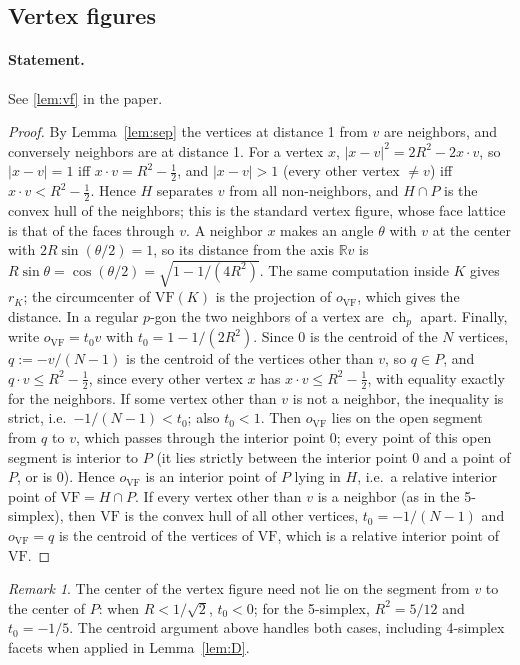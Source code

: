 \documentclass[11pt]{article}
\theoremstyle{definition}
\theoremstyle{remark}
\newtheorem{remark}[theorem]{Remark}
\newcommand{\R}{\mathbb{R}}
\newcommand{\VF}{\mathrm{VF}}
\newcommand{\ch}{\operatorname{ch}}
\begin{document}
\subsection{Vertex figures}

\paragraph{Statement.} See \ref{lem:vf} in the paper.


\begin{proof}
By Lemma~\ref{lem:sep} the vertices at distance 1 from $v$ are neighbors,
and conversely neighbors are at distance 1. For a vertex $x$,
$|x-v|^2=2R^2-2x\cdot v$, so $|x-v|=1$ iff $x\cdot v=R^2-\frac12$, and
$|x-v|>1$ (every other vertex $\ne v$) iff $x\cdot v<R^2-\frac12$. Hence $H$
separates $v$ from all non-neighbors, and $H\cap P$ is the convex hull of
the neighbors; this is the standard vertex figure, whose face lattice is
that of the faces through $v$. A neighbor $x$ makes an angle $\theta$
with $v$ at the center with $2R\sin(\theta/2)=1$, so its distance from
the axis $\R v$ is $R\sin\theta=\cos(\theta/2)=\sqrt{1-1/(4R^2)}$. The
same computation inside $K$ gives $r_K$; the circumcenter of $\VF(K)$ is
the projection of $o_{\VF}$, which gives the distance. In a regular
$p$-gon the two neighbors of a vertex are $\ch_p$ apart. Finally, write
$o_{\VF}=t_0v$ with $t_0=1-1/(2R^2)$. Since $0$ is the centroid of the $N$
vertices, $q:=-v/(N-1)$ is the centroid of the vertices other than $v$, so
$q\in P$, and $q\cdot v\le R^2-\frac12$, since every other vertex $x$ has
$x\cdot v\le R^2-\frac12$, with equality exactly for the neighbors. If some
vertex other than $v$ is not a neighbor, the inequality is strict, i.e.\
$-1/(N-1)<t_0$; also $t_0<1$. Then $o_{\VF}$ lies on the open segment from
$q$ to $v$, which passes through the interior point $0$; every point of
this open segment is interior to $P$ (it lies strictly between the
interior point $0$ and a point of $P$, or is $0$). Hence $o_{\VF}$ is an
interior point of $P$ lying in $H$, i.e.\ a relative interior point of
$\VF=H\cap P$. If every vertex other than $v$ is a neighbor (as in the
5-simplex), then $\VF$ is the convex hull of all other vertices, $t_0=-1/(N-1)$
and $o_{\VF}=q$ is the centroid of the vertices of $\VF$, which is a
relative interior point of $\VF$.
\end{proof}

\setcounter{theorem}{4}
\begin{remark}
The center of the vertex figure need not lie on the segment from $v$
to the center of $P$: when $R<1/\sqrt2$, $t_0<0$; for the 5-simplex,
$R^2=5/12$ and $t_0=-1/5$. The centroid argument above handles both
cases, including 4-simplex facets when applied in Lemma~\ref{lem:D}.
\end{remark}
\end{document}
